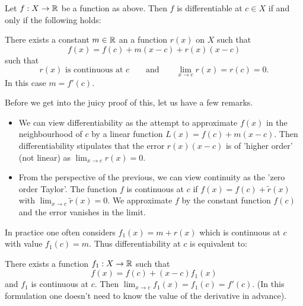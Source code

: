 \documentclass[10pt, a4paper]{article}
\begin{document}
\begin{lemma}\label{pre:analy:lem:firstordertaylorindiffdef}
    Let $f : X \rightarrow \mathbb{R}$ be a function as above.
    Then $f$ is differentiable at $c \in X$ if and only if the following holds:

    There exists a constant $m \in \mathbb{R}$ an a function $r(x)$ on $X$ such that
    \[
    f(x) = f(c) + m(x - c) + r(x)(x - c)
    \]
    such that
    \[
    r(x)\text{ is continuous at } c \qquad\text{and}\qquad\lim_{x \rightarrow c}r(x) = r(c) = 0.
    \]
    In this case $m = f'(c)$.
\end{lemma}
Before we get into the juicy proof of this,
let us have a few remarks.
\begin{remark}\phantom{}
    \begin{itemize}
        \item We can view differentiability as the attempt to approximate $f(x)$ in the neighbourhood of $c$ by a linear function $L(x) = f(c) + m(x - c)$.
        Then differentiability stipulates that the error $r(x)(x - c)$ is of 'higher order'
        (not linear)
        as $\lim_{x \rightarrow c}r(x) = 0$.

        \item From the perspective of the previous,
        we can view continuity as the 'zero order Taylor'.
        The function $f$ is continuous at $c$ if $f(x) = f(c) + \tilde{r}(x)$ with $\lim_{x \rightarrow c}\tilde{r}(x) = 0$.
        We approximate $f$ by the constant function $f(c)$ and the error vanishes in the limit.
    \end{itemize}
\end{remark}

\begin{remark}
    In practice one often considers $f_1(x) = m + r(x)$ which is continuous at $c$ with value $f_1(c) = m$.
    Thus differentiability at $c$ is equivalent to:

    There exists a function $f_1 : X \rightarrow \mathbb{R}$ such that
    \[
    f(x) = f(c) + (x - c)f_1(x)
    \]
    and $f_1$ is continuous at $c$.
    Then $\lim_{x \rightarrow c}f_1(x) = f_1(c) = f'(c)$.
    (In this formulation one doesn't need to know the value of the derivative in advance).
\end{remark}
\end{document}
